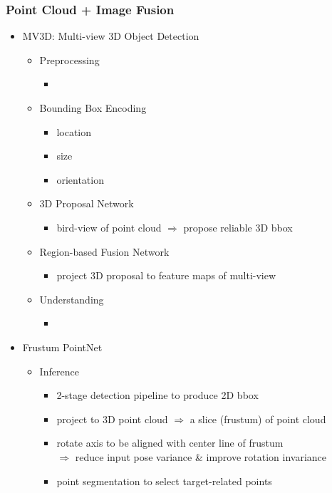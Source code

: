 \subsubsection{Point Cloud + Image Fusion}
\begin{itemize}
\item MV3D: Multi-view 3D Object Detection
	\begin{itemize}
	\item Preprocessing
		\begin{itemize}
		\item 
		\end{itemize}
	\item Bounding Box Encoding
		\begin{itemize}
		\item location
		\item size
		\item orientation
		\end{itemize}
	\item 3D Proposal Network
		\begin{itemize}
		\item bird-view of point cloud $\Rightarrow$ propose reliable 3D bbox
		\end{itemize}
	\item Region-based Fusion Network
		\begin{itemize}
		\item project 3D proposal to feature maps of multi-view
		\end{itemize}
	\item Understanding
		\begin{itemize}
		\item 
		\end{itemize}
	\end{itemize}
\item Frustum PointNet
	\begin{itemize}
	\item Inference
		\begin{itemize}
		\item 2-stage detection pipeline to produce 2D bbox
		\item project to 3D point cloud $\Rightarrow$ a slice (frustum) of point cloud \\
		\item rotate axis to be aligned with center line of frustum \\
		$\Rightarrow$ reduce input pose variance \& improve rotation invariance
		\item point segmentation to select target-related points \\

\end{itemize}
\end{itemize}
\end{itemize}
